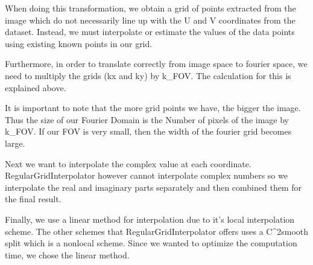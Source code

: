 \documentclass[letterpaper,10pt,english]{jupyterBook}
\begin{document}
\sphinxAtStartPar
When doing this transformation, we obtain a grid of points extracted from the image which do not necessarily line up with the U and V coordinates from the dataset. Instead, we must interpolate or estimate the values of the data points using existing known points in our grid.

\sphinxAtStartPar
Furthermore, in order to translate correctly from image space to fourier space, we need to multiply the grids (kx and ky) by k\_FOV. The calculation for this is explained above.

\sphinxAtStartPar
It is important to note that the more grid points we have, the bigger the image. Thus the size of our Fourier Domain is the Number of pixels of the image by k\_FOV. If our FOV is very small, then the width of the fourier grid becomes large.

\sphinxAtStartPar
Next we want to interpolate the complex value at each coordinate. RegularGridInterpolator however cannot interpolate complex numbers so we interpolate the real and imaginary parts separately and then combined them for the final result.

\sphinxAtStartPar
Finally, we use a linear method for interpolation due to it’s local interpolation scheme. The other schemes that RegularGridInterpolator offers uses a C\textasciicircum{}2\sphinxhyphen{}smooth split which is a non\sphinxhyphen{}local scheme. Since we wanted to optimize the computation time, we chose the linear method.
\end{document}
